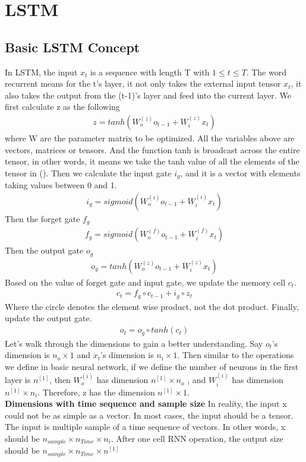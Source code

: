 \documentclass[a4paper]{article}
\begin{document}
\section{LSTM}
\subsection{Basic LSTM Concept}
In LSTM, the input $x_t$ is a sequence with length T with $1 \leq t \leq T$. The word recurrent means for the t's layer, it not only takes the external input tensor $x_t$, it also takes the output from the (t-1)'s layer and feed into the current layer. We first calculate z as the following
\begin{align*}
	z = tanh (W_o^{(z)} o_{t-1} + W_i^{(z)} x_t)
\end{align*}
where W are the parameter matrix to be optimized. All the variables above are vectors, matrices or tensors. And the function tanh is broadcast across the entire tensor, in other words, it means we take the tanh value of all the elements of the tensor in ().
Then we calculate the input gate $i_g$, and it is a vector with elements taking values between 0 and 1.
\begin{align*}
	i_g = sigmoid (W_o^{(i)} o_{t-1} + W_i^{(i)} x_t)
\end{align*}
Then the forget gate $f_g$
\begin{align*}
	f_g = sigmoid (W_o^{(f)} o_{t-1} + W_i^{(f)} x_t)
\end{align*}
Then the output gate $o_g$
\begin{align*}
	o_g = tanh (W_o^{(z)} o_{t-1} + W_i^{(z)} x_t)
\end{align*}
Based on the value of forget gate and input gate, we update the memory cell $c_t$.
\begin{align*}
	c_t = f_g \circ c_{t-1} + i_g \circ z_t
\end{align*}
Where the circle denotes the element wise product, not the dot product. 
Finally, update the output gate.
\begin{align*}
		o_t = o_g \circ tanh (c_t)
\end{align*}
Let's walk through the dimensions to gain a better understanding. Say $o_t$'s dimension is $n_o \times 1$ and $x_t$'s dimension is $n_i \times 1$. Then similar to the operations we define in basic neural network, if we define the number of neurons in the first layer is $n^{[1]}$, then $W_o^{(i)}$ has dimension  $n^{[1]} \times n_o$  , and $W_i^{(i)}$ has dimension  $n^{[1]} \times n_i$.  
Therefore, z has the dimension $n^{[1]} \times 1$.\\
{\bf Dimensions with time sequence and sample size}
In reality, the input x could not be as simple as a vector. In most cases, the input should be a tensor. The input is multiple sample of a time sequence of vectors. In other words, x should be $n_{sample} \times n_{Time} \times n_i$. After one cell RNN operation, the output size should be $n_{sample} \times n_{Time} \times n^{[1]}$
\end{document}
